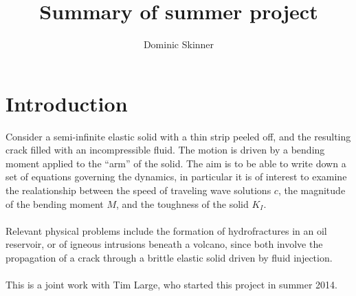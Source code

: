 \documentclass{article}
\begin{document}
\title{Summary of summer project}
\author{Dominic Skinner}
\date{}
\maketitle
{}
\section*{Introduction}
Consider a semi-infinite elastic solid with a thin strip peeled off, and the
resulting crack filled with an incompressible fluid. The motion is driven
by a bending moment applied to the ``arm'' of the solid. The aim is to be
able to write down a set of equations governing the dynamics, in particular
it is of interest to examine the realationship between the speed of traveling
wave solutions $c$, the magnitude of the bending moment $M$, and the toughness 
of the solid $K_I$. 
\\
\\
Relevant physical problems include the formation of hydrofractures in an oil
reservoir, or of igneous intrusions beneath a volcano, since both involve
the propagation of a crack through a brittle elastic solid driven by fluid 
injection.
\\
\\
This is a joint work with Tim Large, who started this project in
summer 2014.
\end{document}
